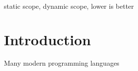 \documentclass{sigplanconf}
\begin{document}

\keywords
static scope, dynamic scope, lower is better

\section{Introduction}

Many modern programming languages~\cite{python,lambda,sml,GoLang,RustLang,mla,haskell98,patenttroll,wikiplia}



\end{document}

